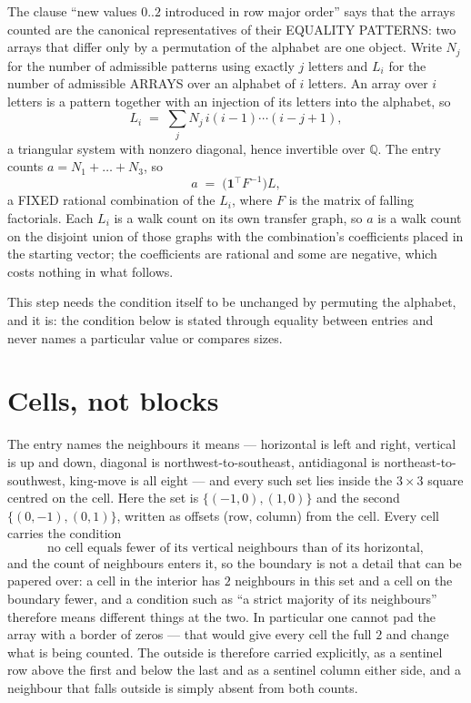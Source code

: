 \documentclass[11pt,a4paper]{article}
\theoremstyle{plain}
\theoremstyle{definition}
\begin{document}
The clause ``new values $0..2$ introduced in row major order'' says that the arrays
counted are the canonical representatives of their EQUALITY PATTERNS: two arrays that differ
only by a permutation of the alphabet are one object. Write $N_j$ for the number of admissible
patterns using exactly $j$ letters and $L_i$ for the number of admissible ARRAYS over an
alphabet of $i$ letters. An array over $i$ letters is a pattern together with an injection of
its letters into the alphabet, so
\[
L_i\;=\;\sum_{j}N_j\,i(i-1)\cdots(i-j+1),
\]
a triangular system with nonzero diagonal, hence invertible over $\mathbb{Q}$. The entry
counts $a=N_1+\dots+N_{3}$, so
\[
a\;=\;\bigl(\mathbf{1}^{\!\top}F^{-1}\bigr)L ,
\]
a FIXED rational combination of the $L_i$, where $F$ is the matrix of falling factorials.
Each $L_i$ is a walk count on its own transfer graph, so $a$ is a walk count on the disjoint
union of those graphs with the combination's coefficients placed in the starting vector; the
coefficients are rational and some are negative, which costs nothing in what follows.

This step needs the condition itself to be unchanged by permuting the alphabet, and it is:
the condition below is stated through equality between entries and never names a particular
value or compares sizes.

\section{Cells, not blocks}

The entry names the neighbours it means --- horizontal is left and right, vertical is up and
down, diagonal is northwest-to-southeast, antidiagonal is northeast-to-southwest, king-move is
all eight --- and every such set lies inside the $3\times3$ square centred on the cell. Here
the set is $\{(-1,0), (1,0)\}$ and the second $\{(0,-1), (0,1)\}$, written as offsets (row, column) from the cell. Every cell carries
the condition
\[
\text{no cell equals fewer of its vertical neighbours than of its horizontal},
\]
and the count of neighbours enters it, so the boundary is not a detail that can be papered
over: a cell in the interior has $2$ neighbours in this set and a cell on the boundary
fewer, and a condition such as ``a strict majority of its neighbours'' therefore means
different things at the two. In particular one cannot pad the array with a border of zeros ---
that would give every cell the full $2$ and change what is being counted. The outside is
therefore carried
explicitly, as a sentinel row above the first and below the last and as a sentinel column
either side, and a neighbour that falls outside is simply absent from both counts.
\end{document}
